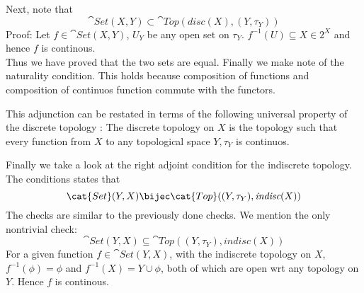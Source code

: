 \begin{frame}
    
Next, note that 
\begin{equation}
    \cat{Set}(X, Y) \subset \cat{Top}(\textit{disc}(X) , (Y, \tau_Y)  )
\end{equation}
Proof: Let \(f \in \cat{Set}(X,Y)\),  \(U_Y\) be any open set on \(\tau_Y\).
\(f^{-1}(U) \subseteq X \in 2^X\) and hence \(f\) is continous. \\
Thus we have proved that the two sets are equal. Finally we make note of the
naturality condition. This holds because composition of functions and
composition of continuos function commute with the functors. 
\end{frame}
\begin{frame}
    
This adjunction can be restated in terms of the following universal property of
the discrete topology : The discrete topology on \(X\) is the topology such that
every function from \(X\) to any topological space \(Y, \tau_Y\) is continuos. 
\end{frame}

\begin{frame}
    Finally we take a look at the right adjoint condition for the indiscrete
    topology. The conditions states that 
    \begin{equation}
         \cat{Set}(Y,X ) \bijec \cat{Top}((Y, \tau_Y) ,\textit{indisc}(X))
    \end{equation}
    The checks are similar to the previously done checks.  We mention the only
    nontrivial check: 
    \begin{equation}
        \cat{Set}(Y,X ) \subseteq\cat{Top}((Y, \tau_Y) ,\textit{indisc}(X))
    \end{equation}
    For a given function \(f \in   \cat{Set}(Y,X )\), with the indiscrete
    topology on \(X\), \(f^{-1}(\phi) = \phi\) and \(f^{-1}(X) = Y \cup \phi\),
    both of which are open wrt any topology on \(Y\). Hence \(f\) is continous. 

\end{frame}
